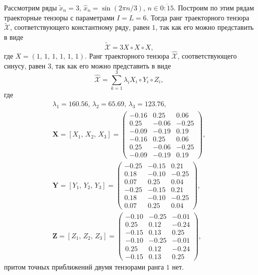 \documentclass[specialist,
    substylefile = spbu_report.rtx,
    subf,href,colorlinks=true, 12pt]{disser}
\theoremstyle{plain}
\theoremstyle{definition}
\theoremstyle{remark}
\begin{document}
    Рассмотрим ряды $\tilde{x}_n=3,\, \hat{x}_n=\sin(2\pi n / 3)$, $n \in \overline{0:15}$.
    Построим по этим рядам траекторные тензоры с параметрами $I=L=6$.
    Тогда ранг траекторного тензора $\tilde{\mathcal{X}}$, соответствующего константному ряду, равен $1$, так как его
    можно представить в виде
    \[
        \tilde{\mathcal{X}} = 3 X\circ X \circ X,
    \]
    где $X=(1,\, 1,\, 1,\, 1,\, 1,\, 1)$.
    Ранг траекторного тензора $\hat{\mathcal{X}}$, соответствующего синусу, равен $3$, так как его можно представить в виде
    \[
        \hat{\mathcal{X}}=\sum_{k=1}^{3}\lambda_i X_i \circ Y_i\circ Z_i,
    \]
    где
    \begin{gather*}
        \lambda_1 =160.56,\, \lambda_2 =65.69,\, \lambda_3 =123.76,\\
        \mathbf{X}=[X_1,\, X_2,\, X_3] =
        \begin{pmatrix}
            -0.16 & 0.25  & 0.06  \\
            0.25  & -0.06 & -0.25 \\
            -0.09 & -0.19 & 0.19  \\
            -0.16 & 0.25  & 0.06  \\
            0.25  & -0.06 & -0.25 \\
            -0.09 & -0.19 & 0.19
        \end{pmatrix},\\
        \mathbf{Y}=[Y_1,\, Y_2,\, Y_3] =
        \begin{pmatrix}
            -0.25 & -0.15 & 0.21  \\
            0.18  & -0.10 & -0.25 \\
            0.07  & 0.25  & 0.04  \\
            -0.25 & -0.15 & 0.21  \\
            0.18  & -0.10 & -0.25 \\
            0.07  & 0.25  & 0.04
        \end{pmatrix},\\
        \mathbf{Z}=[Z_1,\, Z_2,\, Z_3] =
        \begin{pmatrix}
            -0.10 & -0.25 & -0.01 \\
            0.25  & 0.12  & -0.24 \\
            -0.15 & 0.13  & 0.25  \\
            -0.10 & -0.25 & -0.01 \\
            0.25  & 0.12  & -0.24 \\
            -0.15 & 0.13  & 0.25
        \end{pmatrix},
    \end{gather*}
    притом точных приближений двумя тензорами ранга $1$ нет.
\end{document}
